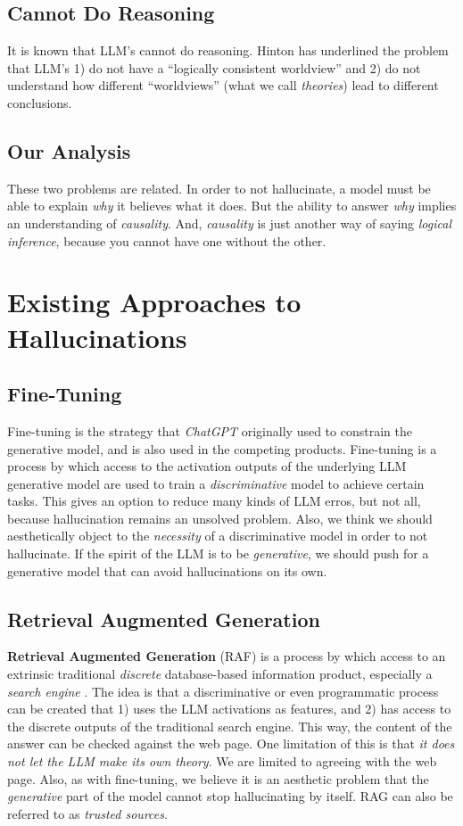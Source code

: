 \documentclass[12pt]{article}
\begin{document}
\subsection{Cannot Do Reasoning}
It is known that LLM's cannot do reasoning.
Hinton \cite{hinton:cbs:2023} has underlined the problem that LLM's 1) do not have a ``logically consistent worldview'' and 2) do not understand how different ``worldviews'' (what we call {\em theories}) lead to different conclusions.
\subsection{Our Analysis}
These two problems are related.
In order to not hallucinate, a model must be able to explain {\em why} it believes what it does.
But the ability to answer {\em why} implies an understanding of {\em causality}.
And, {\em causality} is just another way of saying {\em logical inference}, because you cannot have one without the other.
\section{Existing Approaches to Hallucinations}
\subsection{Fine-Tuning}
Fine-tuning is the strategy that {\em ChatGPT} originally used to constrain the generative model\cite{radford2018improving,radford2019language,brown2020language},
and is also used in the competing products.
Fine-tuning is a process by which access to the activation outputs of the underlying LLM generative model are used
to train a {\em discriminative} model to achieve certain tasks.
This gives an option to reduce many kinds of LLM erros, but not all, because hallucination remains an unsolved problem.
Also, we think we should aesthetically object to the {\em necessity} of a discriminative model in order to not hallucinate.
If the spirit of the LLM is to be {\em generative}, we should push for a generative model that can avoid hallucinations on its own.
\subsection{Retrieval Augmented Generation}
{\bf Retrieval Augmented Generation} (RAF) is a process by which access to an extrinsic traditional {\em discrete} database-based information
product, especially a {\em search engine} \cite{lewis:2020}.
The idea is that a discriminative or even programmatic process can be created that 1) uses the LLM activations as features, and 2) has access to the discrete outputs of the traditional search engine.
This way, the content of the answer can be checked against the web page.
One limitation of this is that {\em it does not let the LLM make its own theory}.
We are limited to agreeing with the web page.
Also, as with fine-tuning, we believe it is an aesthetic problem that the {\em generative} part of the model cannot stop hallucinating by itself.
RAG can also be referred to as {\em trusted sources}.
\end{document}
